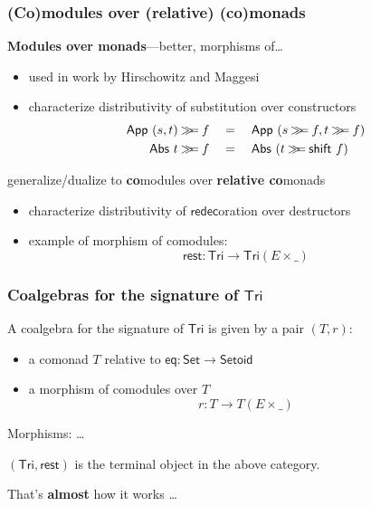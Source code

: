 \documentclass[
serif,
mathsans,
]
{beamer}
\newcommand{\constfont}[1]{\ensuremath{\mathsf{#1}}}
\newcommand{\bind}[2]{{#1}\mathbin{\gg\hspace{-.8ex}=}{#2}}
\newcommand{\Tri}{\constfont{Tri}}
\newcommand{\tail}{\constfont{rest}}
\newcommand{\redec}{\constfont{redec}}
\newcommand{\shift}{\constfont{shift}}
\newcommand{\Setoid}{\constfont{Setoid}}
\newcommand{\eq}{\ensuremath{\mathsf{eq}}}
\newcommand{\App}{\constfont{App}}
\newcommand{\Abs}{\constfont{Abs}}
\newcommand{\Set}{\mathsf{Set}}
\newcommand{\fat}[1]{\textbf{#1}}
\begin{document}
\begin{frame}
 \frametitle{(Co)modules over (relative) (co)monads}
 \begin{block}{\fat{Modules over monads}---better, morphisms of\ldots}
  \begin{itemize}
   \item used in work by Hirschowitz and Maggesi
   \item characterize distributivity of substitution over constructors
      \begin{align*} \bind{\App~(s,t)}{f} \quad &= \quad \App~(\bind{s}{f},\bind{t}{f}) \\
                     \bind{\Abs~t}{f}       \quad &= \quad \Abs~(\bind{t}{\shift~f})
      \end{align*}
  \end{itemize}
 \end{block}

 \begin{block}{generalize/dualize to \fat{co}modules over \fat{relative co}monads}
  \begin{itemize}
   \item characterize distributivity of \redec oration over destructors
   \item example of morphism of comodules:  \[\tail : \Tri \to \Tri(E\times \_)\]
  \end{itemize}
 \end{block} 
\end{frame}

\begin{frame}
 \frametitle{Coalgebras for the signature of $\Tri$}
  \begin{definition}
    A coalgebra for the signature of $\Tri$ is given by a pair $(T,r)$:
    \begin{itemize}
     \item a comonad $T$ relative to $\eq: \Set \to \Setoid$
     \item a morphism of comodules over $T$
        \[  r : T \to T(E \times \_) \]
    \end{itemize}
   Morphisms: \ldots
  \end{definition}

 \begin{lemma}
  $(\Tri,\tail)$ is the terminal object in the above category.
 \end{lemma}

 That's \fat{almost} how it works \ldots
  
\end{frame}
\end{document}
